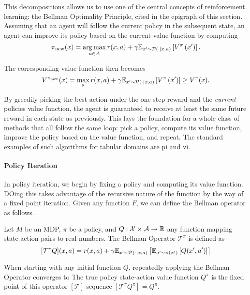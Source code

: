 This decompositions allows us to use one of the central concepts of reinforcement learning: the Bellman Optimality Principle, cited in the epigraph of this section.
Assuming that an agent will follow the current policy in the subsequent state, an agent can improve its policy based on the current value function by computing $$\pi_\mathrm{new}(x) = \operatorname*{arg\,max}_{a \in \mathcal{A}} r(x,a) + \gamma \mathbb{E}_{x'\sim\mathcal{P}(\cdot|x,a)}\left[V^\pi\left(x'\right)\right].$$

The corresponding value function then becomes
$$V^{\pi_\mathrm{new}}(x) = \max_a r(x,a) + \gamma \mathbb{E}_{x'\sim\mathcal{P}(\cdot|x,a)}\left[V^\pi\left(x'\right)\right] \geq V^\pi(x).$$

By greedily picking the best action under the one step reward and the \emph{current} policies value function, the agent is guaranteed to receive at least the same future reward in each state as previously.
This lays the foundation for a whole class of methods that all follow the same loop: pick a policy, compute its value function, improve the policy based on the value function, and repeat.
The standard examples of such algorithms for tabular domains are \ac{pi} and \ac{vi}.

\paragraph{Policy Iteration}

In policy iteration, we begin by fixing a policy and computing its value function.
DOing this takes advantage of the recursive nature of the function by the way of a fixed point iteration.
Given any function $F$, we can define the Bellman operator as follows.

\begin{definition}
    Let $M$ be an MDP, $\pi$ be a policy, and $Q: \mathcal{X} \times \mathcal{A} \rightarrow \mathbb{R}$ any function mapping state-action pairs to real numbers.
    The Bellman Operator $\mathcal{T}^\pi$ is defined as
    $$[\mathcal{T}^\pi Q](x,a) = r(x,a) + \gamma \mathbb{E}_{x'\sim \mathcal{P}(\cdot|x,a)}\left[\mathbb{E}_{a'\sim\pi(x')}\left[Q(x',a')\right]\right]$$
\end{definition}

When starting with any initial function $Q$, repeatedly applying the Bellman Operator converges to 
The true policy state-action value function $Q^\pi$ is the fixed point of this operator $[\mathcal{T}]$ sequence $[\mathcal{T}^\pi Q^\pi] = Q^\pi$.

